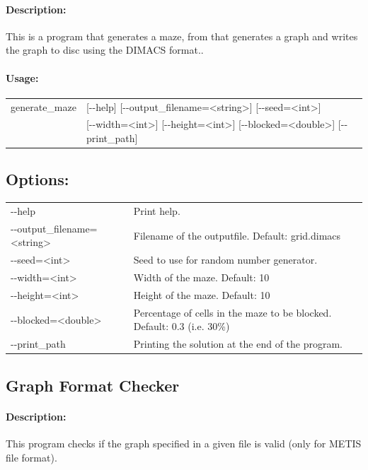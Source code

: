 \documentclass[11pt]{article}
\begin{document}
\paragraph*{Description:} This is a program that generates a maze, from that generates a graph and writes the graph to disc using the DIMACS format..
\paragraph*{Usage:\\} 
\begin{tabular}{ll}
generate\_maze & [-{}-help] [-{}-output\_filename=<string>] [-{}-seed=<int>] \\
               &  [-{}-width=<int>] [-{}-height=<int>] [-{}-blocked=<double>] [-{}-print\_path]
\end{tabular}


\subsection*{Options:\\} 
\begin{tabularx}{\textwidth}{lX}

  -{}-help                        &           Print help. \\
  -{}-output\_filename=<string>    &           Filename of the outputfile. Default: grid.dimacs \\
  -{}-seed=<int>                    &         Seed to use for random number generator. \\
  -{}-width=<int>                    &        Width of the maze. Default: 10 \\
  -{}-height=<int>                    &       Height of the maze. Default: 10 \\
  -{}-blocked=<double>                 &      Percentage of cells in the maze to be blocked. Default: 0.3 (i.e. 30\%) \\
  -{}-print\_path                       &      Printing the solution at the end of the program. \\

\end{tabularx}

\subsection{Graph Format Checker}
\paragraph*{Description:} This program checks if the graph specified in a given file is valid (only for METIS file format). 
\end{document}
